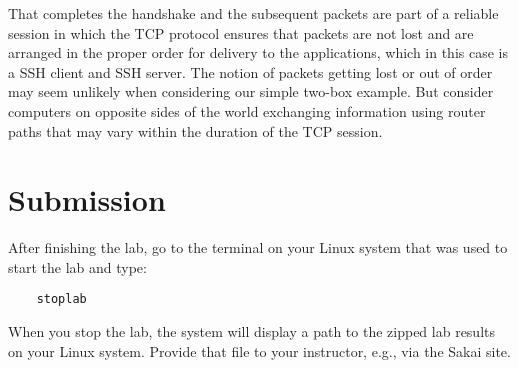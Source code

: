 That completes the handshake and the subsequent packets are part of a reliable session in which the TCP
protocol ensures that packets are not lost and are arranged in the proper order for delivery to the applications,
which in this case is a SSH client and SSH server.  The notion of packets getting lost or out of order may seem
unlikely when considering our simple two-box example.  But consider computers on opposite sides of the world exchanging
information using router paths that may vary within the duration of the TCP session.

\section{Submission}
After finishing the lab, go to the terminal on your Linux system that was used to start the lab and type:
\begin{verbatim}
    stoplab 
\end{verbatim}
When you stop the lab, the system will display a path to the zipped lab results on your Linux system.  Provide that file to 
your instructor, e.g., via the Sakai site.

\copyrightnotice



